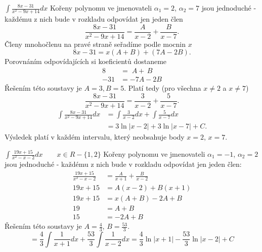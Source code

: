       \begin{example}$\displaystyle\int{\frac{8x-31}{x^2-9x+14}}dx$\cite[s.~90]{Knichal}\newline
        Kořeny polynomu ve jmenovateli $\alpha_1 = 2$, $\alpha_2 = 7$ jsou jednoduché - každému z
        nich bude v rozkladu odpovídat jen jeden člen $$\frac{8x-31}{x^2-9x+14} = \frac{A}{x-2}
        + \frac{B}{x-7}.$$ Členy mnohočlenu na pravé straně seřadíme podle mocnin $x$ $$8x-31 =
         x(A+B)+(7A-2B).$$ Porovnáním odpovídajících si koeficientů dostaneme
        \begin{align*}
          8   &=   \; A + \, B \\
          -31 &= -7A - 2B
        \end{align*}
        Řešením této soustavy je $A = 3, B = 5$. Platí tedy (pro všechna $x \neq 2$ a $x \neq 7$)
        $$\frac{8x-31}{x^2-9x+14} = \frac{3}{x-2} + \frac{5}{x-7}.$$
        \begin{align*}
          \int{\frac{8x-31}{x^2-9x+14}}dx 
            &= \int{\frac{3}{x-2}}dx + \int{\frac{5}{x-7}}dx      \\
            &= 3\ln|x-2| + 3\ln|x-7| + C.
        \end{align*}
        Výsledek platí v každém intervalu, který neobsahuje body \(x = 2\), \(x = 7\).
      \end{example}
      
      \begin{example}\label{MA:eq_ex1}$\displaystyle\int{\frac{19x+15}{x^2-x-2}}dx \qquad 
      x\in
        R-\{1,2\} $ \newline Kořeny polynomu ve jmenovateli $\alpha_1 = -1$, $\alpha_2 = 2$ jsou
        jednoduché - každému z nich bude v rozkladu odpovídat jen jeden člen: 
        \begin{align*}
          \frac{19x+15}{x^2-x-2}     &= \frac{A}{x+1} + \frac{B}{x-2} \\
                           19x +15   &= A(x-2) + B(x+1)               \\
                           19x +15   &= x(A+B) - 2A + B               \\
                           19        &= A + B                         \\
                                15   &=        - 2A + B
        \end{align*}              
        Řešením této soustavy je $A = \frac{4}{3}$, $B = \frac{53}{3}$.
        \begin{equation*}
          = \frac{4}{3}\int{\frac{1}{x+1}}dx+\frac{53}{3}\int{\frac{1}{x-2}}dx 
          = \frac{4}{3}\ln|x+1| - \frac{53}{3}\ln|x-2| +  C
        \end{equation*}      
      \end{example}
  
